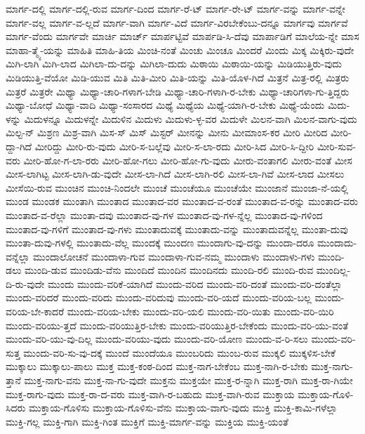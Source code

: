 {ಮಾರ್ಗ-ದಲ್ಲಿ
ಮಾರ್ಗ-ದಲ್ಲಿ-ರುವ
ಮಾರ್ಗ-ದಿಂದ
ಮಾರ್ಗ-ರೆ-ಟ್
ಮಾರ್ಗ-ರೇ-ಟ್
ಮಾರ್ಗ-ವನ್ನು
ಮಾರ್ಗ-ವನ್ನೇ
ಮಾರ್ಗ-ವಲ್ಲ
ಮಾರ್ಗ-ವ-ಲ್ಲದೆ
ಮಾರ್ಗ-ವಾಗಿ
ಮಾರ್ಗ-ವಿದೆ
ಮಾರ್ಗ-ವಿರಬೇಕೆಂಬು-ದನ್ನೂ
ಮಾರ್ಗವು
ಮಾರ್ಗವೆ
ಮಾರ್ಗ-ವೆಂದು
ಮಾರ್ಗವೇ
ಮಾರ್ಚಿ
ಮಾರ್ಚ್
ಮಾರ್ಪಟ್ಟಿವೆ
ಮಾರ್ಪಡಿ-ಸಿ-ದೆವು
ಮಾರ್ಪಾಡಿಗೆ
ಮಾಲೆಯ-ನ್ನೇ
ಮಾಸ
ಮಾಹಾ-ತ್ಮ್ಯೆ-ಯನ್ನು
ಮಾಹಿತಿ
ಮಾಹಿ-ತಿಯ
ಮಿಂಚಿ-ನಂತೆ
ಮಿಂಚು
ಮಿಂಚೂ
ಮಿಂದರೆ
ಮಿಂದು
ಮಿಕ್ಕ
ಮಿಕ್ಕಿರು-ವುದೇ
ಮಿಗಿ-ಲಾಗಿ
ಮಿಗಿ-ಲಾದ
ಮಿಗಿಲಾ-ದು-ದನ್ನು
ಮಿಗಿಲಾ-ದುದು
ಮಿಠಾಯಿ
ಮಿಠಾಯಿ-ಯನ್ನು
ಮಿಡಿಯುತ್ತಿರು-ವುದು
ಮಿಡಿಯುತ್ತಿ-ವೆಯೋ
ಮಿಡಿ-ಯುವ
ಮಿತಿ
ಮಿತಿ-ಮೀರಿ
ಮಿತಿ-ಯನ್ನು
ಮಿತಿ-ಯೊಳ-ಗಿದೆ
ಮಿತ್ರನೆ
ಮಿತ್ರ-ರಲ್ಲಿ
ಮಿತ್ರರು
ಮಿತ್ರರೆ
ಮಿತ್ರರೇ
ಮಿಥ್ಯಾ
ಮಿಥ್ಯಾ-ಚಾರಿ-ಗಳಾಗ-ಬೇಡಿ
ಮಿಥ್ಯಾ-ಚಾರಿ-ಗಳಾಗಿ-ರ-ಬೇಕು
ಮಿಥ್ಯಾ-ಚಾರಿಗಳಾ-ಗು-ತ್ತಿದ್ದರು
ಮಿಥ್ಯಾ-ಬೋಧೆ
ಮಿಥ್ಯಾ-ವಾದಿ
ಮಿಥ್ಯಾ-ಸಂಸಾರದ
ಮಿಥ್ಯೆ
ಮಿಥ್ಯೆಯ
ಮಿಥ್ಯೆ-ಯಾಗಿ-ರ-ಬೇಕು
ಮಿಥ್ಯೆ-ಯೆಂದು
ಮಿದು-ಳನ್ನು
ಮಿದುಳನ್ನೂ
ಮಿದುಳನ್ನೇ
ಮಿದುಳಿನ
ಮಿದುಳು
ಮಿದುಳು-ಳ್ಳ-ವರ
ಮಿದುಳೇ
ಮಿಲನ-ವಾಗಿ
ಮಿಲನ-ವಾಗು-ವುದು
ಮಿಲ್ಟ-ನ್
ಮಿಶ್ರಣ
ಮಿಶ್ರ-ವಾಗಿ
ಮಿಸ-ಸ್
ಮಿಸ್
ಮಿಸ್ಟರ್
ಮೀನನ್ನು
ಮೀನು
ಮೀಮಾಂಸ-ಕರ
ಮೀರಿ
ಮೀರಿದ
ಮೀರಿ-ದ್ದಾ-ಗಿದೆ
ಮೀರಿದ್ದು
ಮೀರಿ-ರು-ವುದು
ಮೀರಿ-ಸ-ಬಲ್ಲೆವು
ಮೀರಿ-ಸ-ಲಾ-ರದು
ಮೀರಿ-ಸಿದ
ಮೀರಿ-ಸಿ-ದ್ದೀರಿ
ಮೀರಿ-ಸುವ-ವರು
ಮೀರಿ-ಹೋ-ಗ-ಲಾ-ರರು
ಮೀರಿ-ಹೋ-ಗಲು
ಮೀರಿ-ಹೋ-ಗು-ವುದು
ಮೀರು-ವಂತಾಗಲಿ
ಮೀರು-ವಂತೆ
ಮೀಸ
ಮೀಸ-ಲಾಗಿಟ್ಟ
ಮೀಸ-ಲಾಗಿ-ಡು-ವುದೇ
ಮೀಸ-ಲಾ-ಗಿದೆ
ಮೀಸ-ಲಾಗಿ-ರಲಿ
ಮೀಸ-ಲಾ-ಗಿವೆ
ಮೀಸ-ಲಾದ
ಮೀಸಲು
ಮೀಸೆಯಿ-ರುವ
ಮುಂಚಿನ
ಮುಂಚಿ-ನಿಂದಲೇ
ಮುಂಚೆ
ಮುಂಚೆಯೂ
ಮುಂಚೆಯೇ
ಮುಂಜಾನೆ
ಮುಂಜಾ-ನೆ-ಯಲ್ಲಿ
ಮುಂಡ
ಮುಂಡಕ
ಮುಂತಾಗಿ
ಮುಂತಾದ
ಮುಂತಾದ-ವರ
ಮುಂತಾದ-ವ-ರಂತೆ
ಮುಂತಾದ-ವ-ರನ್ನು
ಮುಂತಾದ-ವರು
ಮುಂತಾದ-ವ-ರೆಲ್ಲಾ
ಮುಂತಾ-ದವು
ಮುಂತಾದ-ವು-ಗಳ
ಮುಂತಾದ-ವು-ಗಳ-ನ್ನೆಲ್ಲ
ಮುಂತಾದ-ವು-ಗಳಿಂದ
ಮುಂತಾದ-ವು-ಗಳಿಗೆ
ಮುಂತಾದ-ವು-ಗಳು
ಮುಂತಾದುವಕ್ಕೆ
ಮುಂತಾದು-ವನ್ನು
ಮುಂತಾದುವನ್ನೆಲ್ಲ
ಮುಂತಾ-ದುವು
ಮುಂತಾ-ದುವು-ಗಳಲ್ಲಿ
ಮುಂತಾದು-ವೆಲ್ಲ
ಮುಂದಕ್ಕೆ
ಮುಂದಣ
ಮುಂದಾಗು-ವು-ದನ್ನು
ಮುಂದಾ-ದರೂ
ಮುಂದಾದು-ವನ್ನೆಲ್ಲಾ
ಮುಂದಾಲೋಚನೆ
ಮುಂದಾಳಾ-ಗುವ
ಮುಂದಾಳಾ-ಗುವ-ನಮ್ಮ
ಮುಂದಾಳು
ಮುಂದಾಳು-ಗಳು
ಮುಂದಿ-ಡಲು
ಮುಂದಿ-ಡುವ
ಮುಂದಿಡು-ವೆನು
ಮುಂದಿದೆ
ಮುಂದಿನ
ಮುಂದಿನದು
ಮುಂದಿ-ರಲಿ
ಮುಂದಿ-ರುವ
ಮುಂದಿಲ್ಲ-ದಿ-ರು-ವುದೇ
ಮುಂದು
ಮುಂದು-ವರಿಕೆ-ಯಾಗಿದೆ
ಮುಂದು-ವರಿದ
ಮುಂದು-ವರಿ-ದಂತೆ
ಮುಂದು-ವರಿ-ದಂತೆಲ್ಲಾ
ಮುಂದು-ವರಿದರೆ
ಮುಂದು-ವರಿದು
ಮುಂದು-ವರಿದುವು
ಮುಂದು-ವರಿ-ಯದೆ
ಮುಂದು-ವರಿಯ-ಬಲ್ಲ
ಮುಂದು-ವರಿಯ-ಬೇ-ಕಾದರೆ
ಮುಂದು-ವರಿಯ-ಬೇಕು
ಮುಂದು-ವರಿ-ಯಲಿ
ಮುಂದು-ವರಿ-ಯಿತು
ಮುಂದು-ವರಿ-ಯಿರಿ
ಮುಂದು-ವರಿಯು-ತ್ತದೆ
ಮುಂದು-ವರಿಯುತ್ತಿರ-ಬೇಕು
ಮುಂದು-ವರಿಯುತ್ತಿರ-ಬೇಕೆಂದು
ಮುಂದು-ವರಿ-ಯು-ವಂತೆ
ಮುಂದು-ವರಿ-ಯು-ವು-ದಿಲ್ಲ
ಮುಂದು-ವರಿಯು-ವುದು
ಮುಂದು-ವರಿ-ಯೋಣ
ಮುಂದು-ವ-ರಿ-ಸಲು
ಮುಂದು-ವರಿ-ಸುತ್ತ
ಮುಂದು-ವರಿ-ಸು-ವು-ದಕ್ಕೆ
ಮುಂದೆ
ಮುಂದೆಯೂ
ಮುಂಬರಿದು
ಮುಂಬ-ರುವ
ಮುಕ್ಕಲಿ
ಮುಕ್ಕಳಿಸ-ಬೇಕೆ
ಮುಕ್ಕಾಲು
ಮುಕ್ಕಾಲು-ಪಾಲು
ಮುಕ್ತ
ಮುಕ್ತ-ಕಂಠ-ದಿಂದ
ಮುಕ್ತ-ನಾಗ-ಬೇಕೆಂಬ
ಮುಕ್ತ-ನಾಗಿ-ರ-ಬೇಕು
ಮುಕ್ತ-ನಾಗು-ತ್ತಾನೆ
ಮುಕ್ತ-ನಾಗು-ವನು
ಮುಕ್ತ-ನಾ-ಗು-ವುದೇ
ಮುಕ್ತನು
ಮುಕ್ತಯೇ
ಮುಕ್ತ-ರ-ನ್ನಾಗಿ
ಮುಕ್ತ-ರಾಗಿ
ಮುಕ್ತ-ರಾ-ಗಿಯೇ
ಮುಕ್ತ-ರಾಗು-ವುದು
ಮುಕ್ತ-ರಾ-ದ-ವರು
ಮುಕ್ತ-ವಾಗಿ-ರ-ಬಹುದು
ಮುಕ್ತ-ವಾಗಿ-ರುವ
ಮುಕ್ತಾಯ
ಮುಕ್ತಾಯ-ಗೊಳಿ-ಸಿದರು
ಮುಕ್ತಾಯ-ಗೊಳಿಸು
ಮುಕ್ತಾಯ-ಗೊಳಿಸು-ವೆನು
ಮುಕ್ತಾಯ-ವಾಗು-ವುದು
ಮುಕ್ತಿ
ಮುಕ್ತಿ-ಕಾಮಿ-ಗಳೆಲ್ಲಾ
ಮುಕ್ತಿ-ಗಲ್ಲ
ಮುಕ್ತಿ-ಗಾಗಿ
ಮುಕ್ತಿ-ಗಿಂತ
ಮುಕ್ತಿಗೆ
ಮುಕ್ತಿ-ಮಾರ್ಗ-ವನ್ನು
ಮುಕ್ತಿಯ
ಮುಕ್ತಿ-ಯಂತೆ
}
